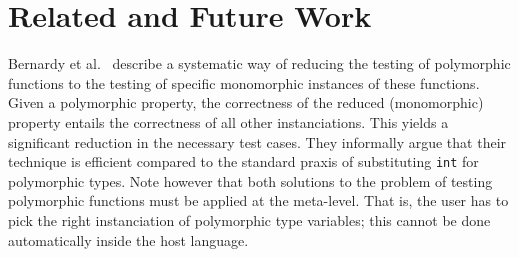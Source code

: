 \section{Related and Future Work}

Bernardy et al.~\cite{DBLP:conf/esop/BernardyJC10} describe a
systematic way of reducing the testing of polymorphic functions to the
testing of specific monomorphic instances of these functions.
%
Given a polymorphic property, the correctness of the reduced
(monomorphic) property entails the correctness of all other
instanciations. This yields a significant reduction in the necessary
test cases.
%
They informally argue that their technique is efficient compared to
the standard praxis of substituting \texttt{int} for polymorphic
types.
%
Note however that both solutions to the problem of testing polymorphic
functions must be applied at the meta-level. That is, the user has to
pick the right instanciation of polymorphic type variables; this
cannot be done automatically inside the host language.
